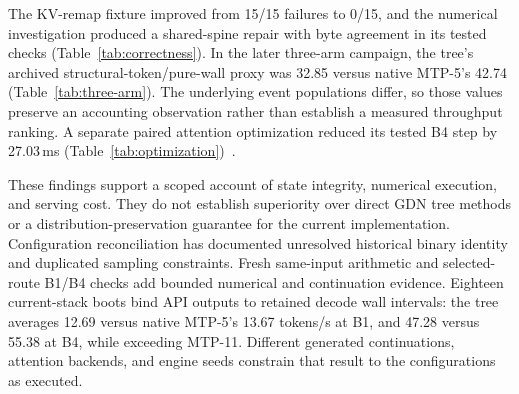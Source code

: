 \documentclass[conference]{IEEEtran}
\begin{document}
The KV-remap fixture improved from 15/15 failures to 0/15, and the numerical investigation produced a shared-spine repair with byte agreement in its tested checks (Table~\ref{tab:correctness}). In the later three-arm campaign, the tree's archived structural-token/pure-wall proxy was 32.85 versus native MTP-5's 42.74 (Table~\ref{tab:three-arm}). The underlying event populations differ, so those values preserve an accounting observation rather than establish a measured throughput ranking. A separate paired attention optimization reduced its tested B4 step by 27.03\,ms (Table~\ref{tab:optimization})~\cite{lumo2026archive}.

These findings support a scoped account of state integrity, numerical execution, and serving cost. They do not establish superiority over direct GDN tree methods or a distribution-preservation guarantee for the current implementation. Configuration reconciliation has documented unresolved historical binary identity and duplicated sampling constraints. Fresh same-input arithmetic and selected-route B1/B4 checks add bounded numerical and continuation evidence. Eighteen current-stack boots bind API outputs to retained decode wall intervals: the tree averages 12.69 versus native MTP-5's 13.67 tokens/s at B1, and 47.28 versus 55.38 at B4, while exceeding MTP-11. Different generated continuations, attention backends, and engine seeds constrain that result to the configurations as executed.

\label{ReferencesStart}


\end{document}

